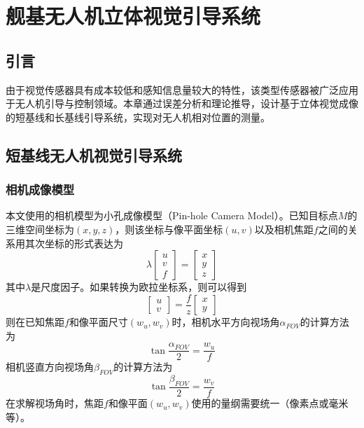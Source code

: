 \chapter{舰基无人机立体视觉引导系统}
\section{引言}
由于视觉传感器具有成本较低和感知信息量较大的特性，该类型传感器被广泛应用于无人机引导与控制领域。本章通过误差分析和理论推导，设计基于立体视觉成像的短基线和长基线引导系统，实现对无人机相对位置的测量。

\section{短基线无人机视觉引导系统}
\subsection{相机成像模型}
本文使用的相机模型为小孔成像模型（Pin-hole Camera Model）。已知目标点$M$的三维空间坐标为$(x,y,z)$，则该坐标与像平面坐标$(u,v)$以及相机焦距$f$之间的关系用其次坐标的形式表达为
\begin{equation}
\lambda\left[ {\begin{array}{*{20}{c}}
	u \\ 
	v \\ 
	f 
	\end{array}} \right] =\left[ {\begin{array}{*{20}{c}}
	x \\ 
	y \\ 
	z 
	\end{array}} \right]
\end{equation}
其中$\lambda$是尺度因子。如果转换为欧拉坐标系，则可以得到
\begin{equation}
\left[ {\begin{array}{*{20}{c}}
	u \\ 
	v 
	\end{array}} \right] =\frac{f}{z} \left[ {\begin{array}{*{20}{c}}
	x \\ 
	y   
	\end{array}} \right]
\end{equation}
则在已知焦距$f$和像平面尺寸$(w_u,w_v)$时，相机水平方向视场角$\alpha_{FOV}$的计算方法为
\begin{equation}
\tan{\frac{\alpha_{FOV}}{2}}=\frac{w_u}{f}
\end{equation}
相机竖直方向视场角$\beta_{FOV}$的计算方法为
\begin{equation}
\tan{\frac{\beta_{FOV}}{2}}=\frac{w_v}{f}
\end{equation}
在求解视场角时，焦距$f$和像平面$(w_u,w_v)$使用的量纲需要统一（像素点或毫米等）。

